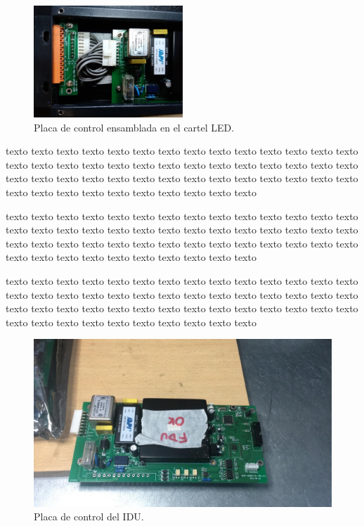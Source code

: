 \documentclass[
11pt, %
]{charter}
\begin{document}
\begin{figure}[htpb]
\centering 
\includegraphics[width=0.5\textwidth]{./Pics/IMG_20210322_130602.jpg}
\caption{Placa de control ensamblada en el cartel LED.}
\label{fig:Placa de control ensamblada}
\end{figure}

texto texto texto texto texto texto texto texto texto texto texto texto texto texto texto texto texto texto texto texto texto texto texto texto texto texto texto texto texto texto texto texto texto texto texto texto texto texto texto texto texto texto texto texto texto texto texto texto texto texto texto texto 


texto texto texto texto texto texto texto texto texto texto texto texto texto texto texto texto texto texto texto texto texto texto texto texto texto texto texto texto texto texto texto texto texto texto texto texto texto texto texto texto texto texto texto texto texto texto texto texto texto texto texto texto 


texto texto texto texto texto texto texto texto texto texto texto texto texto texto texto texto texto texto texto texto texto texto texto texto texto texto texto texto texto texto texto texto texto texto texto texto texto texto texto texto texto texto texto texto texto texto texto texto texto texto texto texto 


\begin{figure}[htpb]
\centering 
\includegraphics[width=1\textwidth]{./Pics/IDU_controller.jpeg}
\caption{Placa de control del IDU.}
\label{fig:controller IDU.}
\end{figure}
\end{document}
